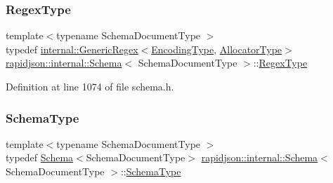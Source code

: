 \mbox{\label{classrapidjson_1_1internal_1_1_schema_a2c16b06523df78f5c354e9a68da90e23}} 
\subsubsection{\texorpdfstring{RegexType}{RegexType}}
{\footnotesize\ttfamily template$<$typename Schema\+Document\+Type $>$ \\
typedef \mbox{\hyperlink{classrapidjson_1_1internal_1_1_generic_regex}{internal\+::\+Generic\+Regex}}$<$\mbox{\hyperlink{classrapidjson_1_1internal_1_1_schema_a39c052d3d1c7431fefc228c1007d0ecb}{Encoding\+Type}}, \mbox{\hyperlink{classrapidjson_1_1internal_1_1_schema_aaca940c164d906fdbf504f562bb2f956}{Allocator\+Type}}$>$ \mbox{\hyperlink{classrapidjson_1_1internal_1_1_schema}{rapidjson\+::internal\+::\+Schema}}$<$ Schema\+Document\+Type $>$\+::\mbox{\hyperlink{classrapidjson_1_1internal_1_1_schema_a2c16b06523df78f5c354e9a68da90e23}{Regex\+Type}}\hspace{0.3cm}{\ttfamily [private]}}



Definition at line 1074 of file schema.\+h.

\mbox{\label{classrapidjson_1_1internal_1_1_schema_a62e03be17971648a9d614244ffcb0f10}} 
\subsubsection{\texorpdfstring{SchemaType}{SchemaType}}
{\footnotesize\ttfamily template$<$typename Schema\+Document\+Type $>$ \\
typedef \mbox{\hyperlink{classrapidjson_1_1internal_1_1_schema}{Schema}}$<$Schema\+Document\+Type$>$ \mbox{\hyperlink{classrapidjson_1_1internal_1_1_schema}{rapidjson\+::internal\+::\+Schema}}$<$ Schema\+Document\+Type $>$\+::\mbox{\hyperlink{classrapidjson_1_1internal_1_1_schema_a62e03be17971648a9d614244ffcb0f10}{Schema\+Type}}}



